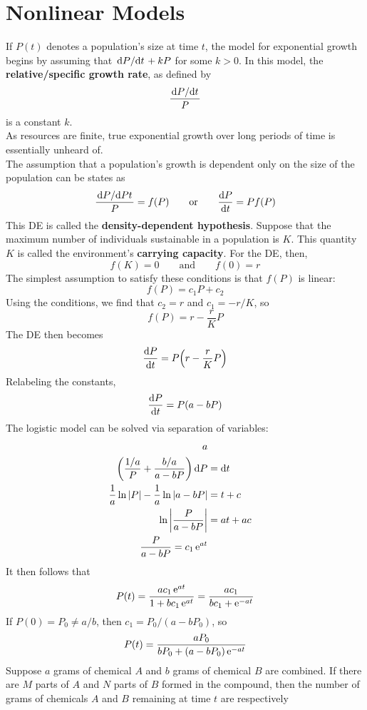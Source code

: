 \documentclass[./Differential Equations.tex]{subfiles}
\begin{document}
	\section{Nonlinear Models}
			If \(P(t)\) denotes a population's size at time \(t\), the model for exponential growth begins by assuming that \(\dv*{P}{t} + kP\) for some \(k > 0\). In this model, the \textbf{relative/specific growth rate}, as defined by
				\[\frac{\dv*{P}{t}}{P}\]
				is a constant \(k\). \\
			As resources are finite, true exponential growth over long periods of time is essentially unheard of. \\
			The assumption that a population's growth is dependent only on the size of the population can be states as
				\[\frac{\dv*{P}{Pt}}{P} = f(P) \qquad \text{or} \qquad \dv{P}{t} = Pf(P)\]
				This DE is called the \textbf{density-dependent hypothesis}.
			Suppose that the maximum number of individuals sustainable in a population is \(K\). This quantity \(K\) is called the environment's \textbf{carrying capacity}. For the DE, then,
				\[f(K) = 0 \qquad \text{and} \qquad f(0) = r\]
			 	The simplest assumption to satisfy these conditions is that \(f(P)\) is linear:
			 	\[f(P) = c_1P + c_2\]
			 	Using the conditions, we find that \(c_2 = r\) and \(c_1 = -r/K\), so 
			 	\[f(P) = r - \frac{r}{K}P\]
			 	The DE then becomes
			 	\[\dv{P}{t} = P\Bigl(r - \frac{r}{K}P\Bigr)\]
			 	Relabeling the constants,
			 	\[\dv{P}{t} = P(a - bP)\]
			The logistic model can be solved via separation of variables:
				\begin{align*}
				a \\
					\left(\frac{1/a}{P} + \frac{b/a}{a - bP}\right)\dd{P} &= \dd{t} \\
					\frac{1}{a}\ln|P| - \frac{1}{a}\ln|a - bP| &= t + c \\
					\ln\left|\frac{P}{a - bP}\right| &= at + ac \\
					\frac{P}{a - bP} = c_1\operatorname{e}^{at}
				\end{align*}
				It then follows that
				\[P(t) = \frac{ac_1\operatorname{e}^{at}}{1 + bc_1\operatorname{e}^{at}} = \frac{ac_1}{bc_1 + \operatorname{e}^{-at}}\]
				If \(P(0) = P_0 \ne a/b\), then \(c_1 = P_0/(a - bP_0)\), so
				\[P(t) = \frac{aP_0}{bP_0 + (a - bP_0)\operatorname{e}^{-at}}\]
			Suppose \(a\) grams of chemical \(A\) and \(b\) grams of chemical \(B\) are combined. If there are \(M\) parts of \(A\) and \(N\) parts of \(B\) formed in the compound, then the number of grams of chemicals \(A\) and \(B\) remaining at time \(t\) are respectively
\end{document}
